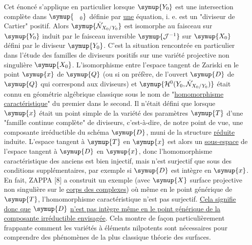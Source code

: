  Cet énoncé s'applique en particulier lorsque $\symup{Y_0}$ est
une intersection complète dans $\symup{\phantom{X}_0}$ définie par \uline{une} équation, i. e. est un
"diviseur de Cartier" positif. Alors $\symup{\check{\mathcal N}_{X_0/Y_0}}$ est isomorphe au
faisceau sur $\symup{Y_0}$ induit par le faisceau inversible $\symup{\mathcal J^{-1}}$ sur
$\symup{X_0}$ défini par le diviseur $\symup{Y_0}$. C'est la situation rencontrée en particulier
dans l'étude des familles de diviseurs positifs sur une variété projective non
singulière $\symup{X_0}$. L'isomorphisme entre l'espace tangent de Zariski en le point
$\symup{x}$ de $\symup{Q}$ (ou si on préfère, de l'ouvert $\symup{D}$ de $\symup{Q}$ qui correspond aux
diviseurs) et $\symup{\mathcal H^0(Y_0,\check{\mathcal N}_{X_0/Y_0})}$ était connu en géométrie
algébrique classique sous le nom de "\uline{homomorphisme caractéristique}" du premier
dans le second. Il n'était défini que lorsque $\symup{x}$ était un point simple de la
variété des paramètres $\symup{T}$ d'une "famille continue complète" de diviseurs,
c'est-à-dire, de notre point de vue, une composante irréductible du schéma
$\symup{D}$, muni de la structure \uline{réduite} induite. L'espace tangent à $\symup{T}$ en $\symup{x}$ est alors
un \uline{sous-espace} de l'espace tangent à $\symup{D}$ en $\symup{x}$, donc l'homomorphisme
caractéristique des anciens est bien injectif, mais n'est surjectif que sous des
conditions supplémentaires, par exemple si $\symup{D}$ est intègre en $\symup{x}$. En fait,
ZAPPA [8] a construit un exemple
(avec $\symup{X}$ surface projective non singulière sur le \uline{corps des complexes}) où même
en le point générique de $\symup{T}$, l'homomorphisme caractéristique n'est pas
surjectif. \uline{Cela signifie donc que} $\symup{D}$ \uline{n'est pas intègre même en le point
générique de la composante irréductible envisagée}. Cela montre de façon
particulièrement frappante comment les variétés à éléments nilpotents sont
nécessaires pour comprendre des phénomènes de la plus classique théorie des
surfaces.

